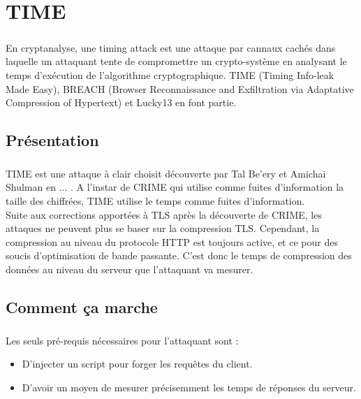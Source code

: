 \chapter{TIME}
\label{chapter:time}

\paragraph{}
En cryptanalyse, une timing attack est une attaque par cannaux cachés dans laquelle un attaquant tente de compromettre un crypto-système en analysant le temps d'exécution de l'algorithme cryptographique. TIME (Timing Info-leak Made Easy), BREACH (Browser Reconnaissance and Exfiltration via Adaptative Compression of Hypertext) et Lucky13 en font partie.

\section{Présentation}
\paragraph{}
TIME est une attaque à clair choisit découverte par Tal Be'ery et Amichai Shulman en ... . A l'instar de CRIME qui utilise comme fuites d'information la taille des chiffrées, TIME utilise le temps comme fuites d'information.\\

Suite aux corrections apportées à TLS après la découverte de CRIME, les attaques ne peuvent plus se baser sur la compression TLS. Cependant, la compression au niveau du protocole HTTP est toujours active, et ce pour des soucis d'optimisation de bande passante. C'est donc le temps de compression des données au niveau du serveur que l'attaquant va mesurer.

\section{Comment ça marche}
\paragraph{}
Les seuls pré-requis nécessaires pour l'attaquant sont :
\begin{itemize}
  \item D'injecter un script pour forger les requêtes du client.
  \item D'avoir un moyen de mesurer précisemment les temps de réponses du serveur.
\end{itemize}

